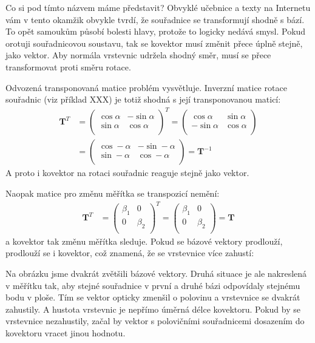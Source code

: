 \documentclass[a5paper,12pt]{amsbook}
\theoremstyle{definition}
\newcommand{\mymatrix}[1]{\mathbf{#1}}
\begin{document}
Co si pod tímto názvem máme představit? Obvyklé učebnice a texty na Internetu vám v tento
okamžik obvykle tvrdí, že souřadnice se transformují shodně s bází. To opět samoukům
působí bolesti hlavy, protože to logicky nedává smysl. Pokud orotuji souřadnicovou
soustavu, tak se kovektor musí změnit přece úplně stejně, jako vektor. Aby normála
vrstevnic udržela shodný směr, musí se přece transformovat proti směru rotace.

Odvozená transponovaná matice problém vysvětluje. Inverzní matice rotace souřadnic
(viz příklad XXX) je totiž shodná s její transponovanou maticí:
\begin{equation*}
\begin{split}
\mymatrix{T}^T &= \left(\begin{array}{cc}
\cos\alpha & -\sin\alpha\\
\sin\alpha & \cos\alpha\\
\end{array}\right)^T = \left(\begin{array}{cc}
\cos\alpha & \sin\alpha\\
-\sin\alpha & \cos\alpha\\
\end{array}\right) \\
&= \left(\begin{array}{cc}
\cos-\alpha & -\sin-\alpha\\
\sin-\alpha & \cos-\alpha\\
\end{array}\right) = \mymatrix{T}^{-1}
\end{split}
\end{equation*}
A proto i kovektor na rotaci souřadnic reaguje stejně jako vektor.

Naopak matice pro změnu měřítka se transpozicí nemění:
\begin{equation*}
\begin{split}
\mymatrix{T}^T &= \left(\begin{array}{cc}
\beta_1 & 0 \\
0 & \beta_2 \\
\end{array}\right)^T = \left(\begin{array}{cc}
\beta_1 & 0 \\
0 & \beta_2 \\
\end{array}\right) = \mymatrix{T}
\end{split}
\end{equation*}
a kovektor tak změnu měřítka sleduje. Pokud se bázové vektory prodlouží,
prodlouží se i kovektor, což znamená, že se vrstevnice více zahustí:
\begin{center}

\end{center}
Na obrázku jsme dvakrát zvětšili bázové vektory. Druhá situace je ale
nakreslená v měřítku tak, aby stejné souřadnice v první a druhé bázi odpovídaly
stejnému bodu v ploše. Tím se vektor opticky zmenšil o polovinu a vrstevnice
se dvakrát zahustily. A hustota vrstevnic je nepřímo úměrná délce kovektoru.
Pokud by se vrstevnice nezahustily, začal by vektor s polovičními souřadnicemi
dosazením do kovektoru vracet jinou hodnotu.
\end{document}

